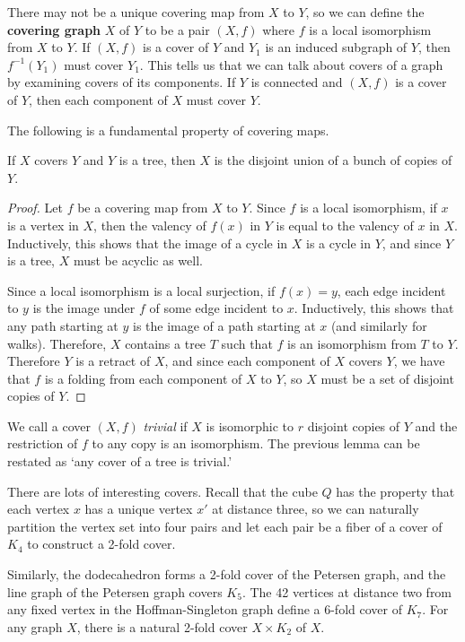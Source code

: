 There may not be a unique covering map from $X$ to $Y$, so we can define the \textbf{covering graph} $X$ of $Y$ to be a pair $(X,f)$ where $f$ is a local isomorphism from $X$ to $Y$.  If $(X,f)$ is a cover of $Y$ and $Y_1$ is an induced subgraph of $Y$, then $f^{-1}(Y_1)$ must cover $Y_1$.  This tells us that we can talk about covers of a graph by examining covers of its components. If $Y$ is connected and $(X,f)$ is a cover of $Y$, then each component of $X$ must cover $Y$.

The following is a fundamental property of covering maps.

\begin{lemma}
	If $X$ covers $Y$ and $Y$ is a tree, then $X$ is the disjoint union of a bunch of copies of $Y$.
\end{lemma}
\begin{proof}
	Let $f$ be a covering map from $X$ to $Y$.  Since $f$ is a local isomorphism, if $x$ is a vertex in $X$, then the valency of $f(x)$ in $Y$ is equal to the valency of $x$ in $X$.  Inductively, this shows that the image of a cycle in $X$ is a cycle in $Y$, and since $Y$ is a tree, $X$ must be acyclic as well.
	
	Since a local isomorphism is a local surjection, if $f(x)=y$, each edge incident to $y$ is the image under $f$ of some edge incident to $x$.  Inductively, this shows that any path starting at $y$ is the image of a path starting at $x$ (and similarly for walks).  Therefore, $X$ contains a tree $T$ such that $f$ is an isomorphism from $T$ to $Y$.  Therefore $Y$ is a retract of $X$, and since each component of $X$ covers $Y$, we have that $f$ is a folding from each component of $X$ to $Y$, so $X$ must be a set of disjoint copies of $Y$.
\end{proof}



We call a cover $(X,f)$ \textit{trivial} if $X$ is isomorphic to $r$ disjoint copies of $Y$ and the restriction of $f$ to any copy is an isomorphism.  The previous lemma can be restated as `any cover of a tree is trivial.'

There are lots of interesting covers.  Recall that the cube $Q$ has the property that each vertex $x$ has a unique vertex $x'$ at distance three, so we can naturally partition the vertex set into four pairs and let each pair be a fiber of a cover of $K_4$ to construct a 2-fold cover.

Similarly, the dodecahedron forms a 2-fold cover of the Petersen graph, and the line graph of the Petersen graph covers $K_5$.  The 42 vertices at distance two from any fixed vertex in the Hoffman-Singleton graph define a 6-fold cover of $K_7$.  For any graph $X$, there is a natural 2-fold cover $X\times K_2$ of $X$.

